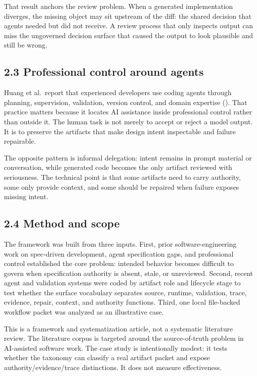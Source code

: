 \documentclass[
]{article}
\begin{document}
That result anchors the review problem. When a generated implementation
diverges, the missing object may sit upstream of the diff: the shared
decision that agents needed but did not receive. A review process that
only inspects output can miss the ungoverned decision surface that
caused the output to look plausible and still be wrong.

\subsection{2.3 Professional control around
agents}\label{professional-control-around-agents}

Huang et al.~report that experienced developers use coding agents
through planning, supervision, validation, version control, and domain
expertise ().
That practice matters because it locates AI assistance inside
professional control rather than outside it. The human task is not
merely to accept or reject a model output. It is to preserve the
artifacts that make design intent inspectable and failure repairable.

The opposite pattern is informal delegation: intent remains in prompt
material or conversation, while generated code becomes the only artifact
reviewed with seriousness. The technical point is that some artifacts
need to carry authority, some only provide context, and some should be
repaired when failure exposes missing intent.

\subsection{2.4 Method and scope}\label{method-and-scope}

The framework was built from three inputs. First, prior
software-engineering work on spec-driven development, agent
specification gaps, and professional control established the core
problem: intended behavior becomes difficult to govern when
specification authority is absent, stale, or unreviewed. Second, recent
agent and validation systems were coded by artifact role and lifecycle
stage to test whether the surface vocabulary separates source, runtime,
validation, trace, evidence, repair, context, and authority functions.
Third, one local file-backed workflow packet was analyzed as an
illustrative case.

This is a framework and systematization article, not a systematic
literature review. The literature corpus is targeted around the
source-of-truth problem in AI-assisted software work. The case study is
intentionally modest: it tests whether the taxonomy can classify a real
artifact packet and expose authority/evidence/trace distinctions. It
does not measure effectiveness.
\end{document}
